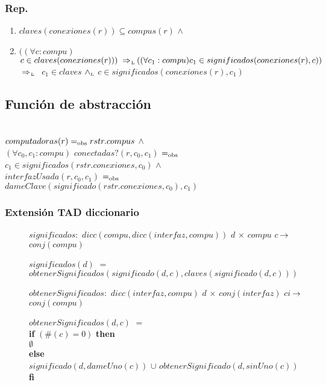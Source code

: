 \subsubsection*{Rep.}
\begin{enumerate}
\item[] $claves(conexiones(r)) \subseteq compus(r)$ $\land$
\item[] $((\forall c : compu)$ $c \in claves(conexiones(r))) \impluego \\
		((\forall c_1 : compu) c_1 \in significados(conexiones(r),c))$ $\impluego$ $c_1 \in claves$ $\land_{\mathrm{\scriptscriptstyle{L}}}$ $c \in significados(conexiones(r),c_1)$
\end{enumerate}

\subsection{Función de abstracción}

 \\
$computadoras(r) =_{\mathrm{obs}} rstr.compus$ $\land$ \\
$(\forall c_0,c_1:compu)$ $conectadas?(r,c_0,c_1)$ $=_{\mathrm{obs}}$ $c_1 \in significados(rstr.conexiones,c_0)$ $\land$\\
$interfazUsada(r,c_0,c_1)$ $=_{\mathrm{obs}}$ $dameClave(significado(rstr.conexiones,c_0),c_1)$

\subsubsection*{Extensión TAD diccionario}
\begin{description} 
\item[] $significados:$ $dicc(compu,dicc(interfaz,compu))$ $d$ $\times$ $compu$ $c$ $\!\rightarrow\!$ $conj(compu)$ \setlength{\parindent}{1cm} \indent
\item[] $significados(d)$ $=$  $obtenerSignificados(significado(d,c),claves(significado(d,c)))$
\\
\item[] $obtenerSignificados:$ $dicc(interfaz,compu)$ $d$ $\times$ $conj(interfaz)$ $ci$ $\!\rightarrow\!$ $conj(compu)$ \setlength{\parindent}{0.1cm} \indent
\item[] $obtenerSignificados(d,c)$ $=$
	\setlength{\parindent}{1cm}\\ \textbf{if} $(\#(c) = 0)$ \textbf{then}
		\\ \indent$\emptyset$
	\\ \textbf{else} 
		\\\indent  $significado(d,dameUno(c))$ $\cup$ $obtenerSignificado(d,sinUno(c))$
	\\  \textbf{fi} 
\end{description}

